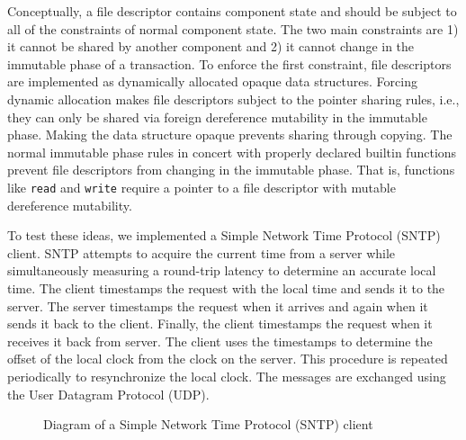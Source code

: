 Conceptually, a file descriptor contains component state and should be subject to all of the constraints of normal component state.
The two main constraints are 1) it cannot be shared by another component and 2) it cannot change in the immutable phase of a transaction.
To enforce the first constraint, file descriptors are implemented as dynamically allocated opaque data structures.
Forcing dynamic allocation makes file descriptors subject to the pointer sharing rules, i.e., they can only be shared via foreign dereference mutability in the immutable phase.
Making the data structure opaque prevents sharing through copying.
The normal immutable phase rules in concert with properly declared builtin functions prevent file descriptors from changing in the immutable phase.
That is, functions like \verb+read+ and \verb+write+ require a pointer to a file descriptor with mutable dereference mutability.

To test these ideas, we implemented a Simple Network Time Protocol (SNTP) client.
SNTP attempts to acquire the current time from a server while simultaneously measuring a round-trip latency to determine an accurate local time.
The client timestamps the request with the local time and sends it to the server.
The server timestamps the request when it arrives and again when it sends it back to the client.
Finally, the client timestamps the request when it receives it back from server.
The client uses the timestamps to determine the offset of the local clock from the clock on the server.
This procedure is repeated periodically to resynchronize the local clock.
The messages are exchanged using the User Datagram Protocol (UDP).

\begin{figure}
\centering
{}%
\caption{Diagram of a Simple Network Time Protocol (SNTP) client\label{sntp}}
\end{figure}

